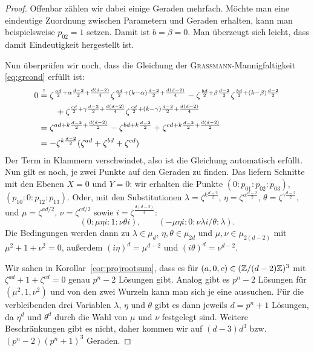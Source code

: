 \begin{proof}
Offenbar zählen wir dabei einige Geraden mehrfach. Möchte man eine eindeutige Zuordnung zwischen Parametern und Geraden erhalten, kann man beispielsweise $p_{02} = 1$ setzen. Damit ist $b = \beta = 0$. Man überzeugt sich leicht, dass damit Eindeutigkeit hergestellt ist.

Nun überprüfen wir noch, dass die Gleichung der \textsc{Grassmann}-Mannigfaltigkeit \eqref{eq:grcond} erfüllt ist:
\begin{align*}
0 &\overrel{=}^! \zeta^{\frac{ad}2+\alpha\frac{d-2}2+\frac{d(d-2)}4} \zeta^{\frac{ad}2+(k-\alpha)\frac{d-2}2+\frac{d(d-2)}4} - \zeta^{\frac{bd}2+\beta\frac{d-2}2} \zeta^{\frac{bd}2+(k-\beta)\frac{d-2}2} \\
  &\qquad + \zeta^{\frac{cd}2+\gamma\frac{d-2}2+\frac{d(d-2)}4} \zeta^{\frac{cd}2+(k-\gamma)\frac{d-2}2+\frac{d(d-2)}4} \\
  &= \zeta^{ad + k\frac{d-2}2 + \frac{d(d-2)}2} - \zeta^{bd + k\frac{d-2}2} + \zeta^{cd + k\frac{d-2}2 + \frac{d(d-2)}2} \\
  &= -\zeta^{k\frac{d-2}2}(\zeta^{ad} + \zeta^{bd} + \zeta^{cd})
\end{align*}
Der Term in Klammern verschwindet, also ist die Gleichung automatisch erfüllt. Nun gilt es noch, je zwei Punkte auf den Geraden zu finden. Das liefern Schnitte mit den Ebenen $X=0$ und $Y=0$: wir erhalten die Punkte $(0:p_{01}:p_{02}:p_{03})$, $(p_{10}:0:p_{12}:p_{13})$. Oder, mit den Substitutionen $\lambda = \zeta^{k \frac{d-2}2}$, $\eta = \zeta^{\alpha \frac{d-2}2}$, $\theta = \zeta^{\gamma\frac{d-2}2}$, und $\mu = \zeta^{ad/2}$, $\nu = \zeta^{cd/2}$ sowie $i = \zeta^{\frac{d(d-2)}4}$:
\begin{equation}
(0:\mu\eta i:1:\nu\theta i),\qquad
(-\mu\eta i:0:\nu\lambda i/\theta:\lambda).
\end{equation}
Die Bedingungen werden dann zu $\lambda \in \mu_d$, $\eta, \theta \in \mu_{2d}$ und $\mu, \nu \in \mu_{2(d-2)}$ mit $\mu^2 + 1 + \nu^2 = 0$, außerdem $(i\eta)^d = \mu^{d-2}$ und $(i\theta)^d = \nu^{d-2}$.

Wir sahen in Korollar~\ref{cor:projrootsum}, dass es für $(a,0,c) \in (\Zmod (d-2)Z)^3$ mit $\zeta^{ad} + 1 + \zeta^{cd} = 0$ genau $p^n-2$ Lösungen gibt. Analog gibt es $p^n-2$ Lösungen für $(\mu^2, 1, \nu^2)$ und von den zwei Wurzeln kann man sich je eine aussuchen. Für die verbleibenden drei Variablen $\lambda$, $\eta$ und $\theta$ gibt es dann jeweils $d=p^n+1$ Lösungen, da $\eta^d$ und $\theta^d$ durch die Wahl von $\mu$ und $\nu$ festgelegt sind. Weitere Beschränkungen gibt es nicht, daher kommen wir auf $(d-3)d^3$ bzw. $(p^n-2)(p^n+1)^3$ Geraden.


\end{proof}
